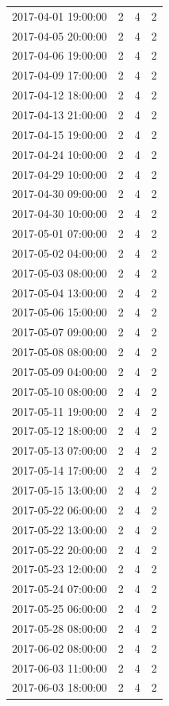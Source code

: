 \begin{tabular}{lrrr}
2017-04-01 19:00:00 & 2 & 4 & 2 \\
2017-04-05 20:00:00 & 2 & 4 & 2 \\
2017-04-06 19:00:00 & 2 & 4 & 2 \\
2017-04-09 17:00:00 & 2 & 4 & 2 \\
2017-04-12 18:00:00 & 2 & 4 & 2 \\
2017-04-13 21:00:00 & 2 & 4 & 2 \\
2017-04-15 19:00:00 & 2 & 4 & 2 \\
2017-04-24 10:00:00 & 2 & 4 & 2 \\
2017-04-29 10:00:00 & 2 & 4 & 2 \\
2017-04-30 09:00:00 & 2 & 4 & 2 \\
2017-04-30 10:00:00 & 2 & 4 & 2 \\
2017-05-01 07:00:00 & 2 & 4 & 2 \\
2017-05-02 04:00:00 & 2 & 4 & 2 \\
2017-05-03 08:00:00 & 2 & 4 & 2 \\
2017-05-04 13:00:00 & 2 & 4 & 2 \\
2017-05-06 15:00:00 & 2 & 4 & 2 \\
2017-05-07 09:00:00 & 2 & 4 & 2 \\
2017-05-08 08:00:00 & 2 & 4 & 2 \\
2017-05-09 04:00:00 & 2 & 4 & 2 \\
2017-05-10 08:00:00 & 2 & 4 & 2 \\
2017-05-11 19:00:00 & 2 & 4 & 2 \\
2017-05-12 18:00:00 & 2 & 4 & 2 \\
2017-05-13 07:00:00 & 2 & 4 & 2 \\
2017-05-14 17:00:00 & 2 & 4 & 2 \\
2017-05-15 13:00:00 & 2 & 4 & 2 \\
2017-05-22 06:00:00 & 2 & 4 & 2 \\
2017-05-22 13:00:00 & 2 & 4 & 2 \\
2017-05-22 20:00:00 & 2 & 4 & 2 \\
2017-05-23 12:00:00 & 2 & 4 & 2 \\
2017-05-24 07:00:00 & 2 & 4 & 2 \\
2017-05-25 06:00:00 & 2 & 4 & 2 \\
2017-05-28 08:00:00 & 2 & 4 & 2 \\
2017-06-02 08:00:00 & 2 & 4 & 2 \\
2017-06-03 11:00:00 & 2 & 4 & 2 \\
2017-06-03 18:00:00 & 2 & 4 & 2 \\

\end{tabular}
